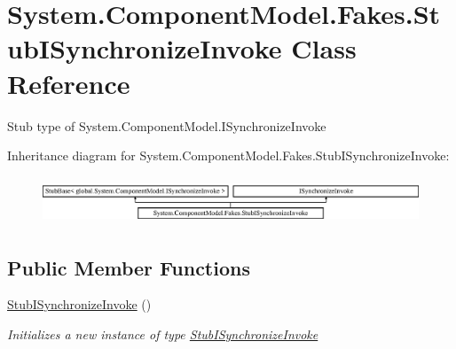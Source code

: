 \hypertarget{class_system_1_1_component_model_1_1_fakes_1_1_stub_i_synchronize_invoke}{\section{System.\-Component\-Model.\-Fakes.\-Stub\-I\-Synchronize\-Invoke Class Reference}
\label{class_system_1_1_component_model_1_1_fakes_1_1_stub_i_synchronize_invoke}
}


Stub type of System.\-Component\-Model.\-I\-Synchronize\-Invoke 


Inheritance diagram for System.\-Component\-Model.\-Fakes.\-Stub\-I\-Synchronize\-Invoke\-:\begin{figure}[H]
\begin{center}
\leavevmode
\includegraphics[height=1.428571cm]{class_system_1_1_component_model_1_1_fakes_1_1_stub_i_synchronize_invoke}
\end{center}
\end{figure}
\subsection*{Public Member Functions}
\begin{DoxyCompactItemize}
\item 
\hyperlink{class_system_1_1_component_model_1_1_fakes_1_1_stub_i_synchronize_invoke_adeb12978c027b30da167f1a919b9d2ed}{Stub\-I\-Synchronize\-Invoke} ()
\begin{DoxyCompactList}\small\item\em Initializes a new instance of type \hyperlink{class_system_1_1_component_model_1_1_fakes_1_1_stub_i_synchronize_invoke}{Stub\-I\-Synchronize\-Invoke}\end{DoxyCompactList}\end{DoxyCompactItemize}
